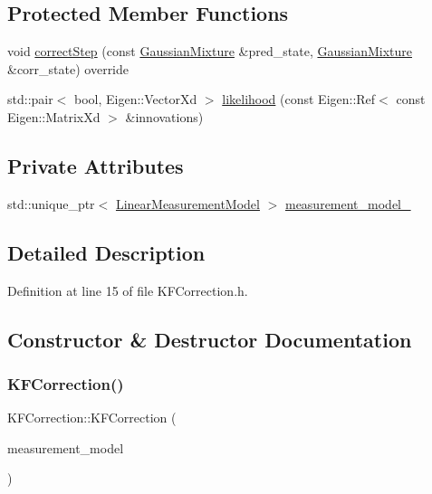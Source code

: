 \subsection*{Protected Member Functions}
\begin{DoxyCompactItemize}
\item 
void \mbox{\hyperlink{classbfl_1_1KFCorrection_ac97f8001212bd43071a1e4f2f7fe649d}{correct\+Step}} (const \mbox{\hyperlink{classbfl_1_1GaussianMixture}{Gaussian\+Mixture}} \&pred\+\_\+state, \mbox{\hyperlink{classbfl_1_1GaussianMixture}{Gaussian\+Mixture}} \&corr\+\_\+state) override
\item 
std\+::pair$<$ bool, Eigen\+::\+Vector\+Xd $>$ \mbox{\hyperlink{classbfl_1_1KFCorrection_a52dbdd94e4ff2472654706a397764088}{likelihood}} (const Eigen\+::\+Ref$<$ const Eigen\+::\+Matrix\+Xd $>$ \&innovations)
\end{DoxyCompactItemize}
\subsection*{Private Attributes}
\begin{DoxyCompactItemize}
\item 
std\+::unique\+\_\+ptr$<$ \mbox{\hyperlink{classbfl_1_1LinearMeasurementModel}{Linear\+Measurement\+Model}} $>$ \mbox{\hyperlink{classbfl_1_1KFCorrection_a4e6d053bf4a6fb2270b34c7c866b4347}{measurement\+\_\+model\+\_\+}}
\end{DoxyCompactItemize}


\subsection{Detailed Description}


Definition at line 15 of file K\+F\+Correction.\+h.



\subsection{Constructor \& Destructor Documentation}
\mbox{\label{classbfl_1_1KFCorrection_a4d676d6417b521731f2e88d3507168b7}} 
\subsubsection{\texorpdfstring{K\+F\+Correction()}{KFCorrection()}\hspace{0.1cm}{\footnotesize\ttfamily [1/2]}}
{\footnotesize\ttfamily K\+F\+Correction\+::\+K\+F\+Correction (\begin{DoxyParamCaption}\item[{std\+::unique\+\_\+ptr$<$ \mbox{\hyperlink{classbfl_1_1LinearMeasurementModel}{Linear\+Measurement\+Model}} $>$}]{measurement\+\_\+model }\end{DoxyParamCaption})\hspace{0.3cm}{\ttfamily [noexcept]}}



